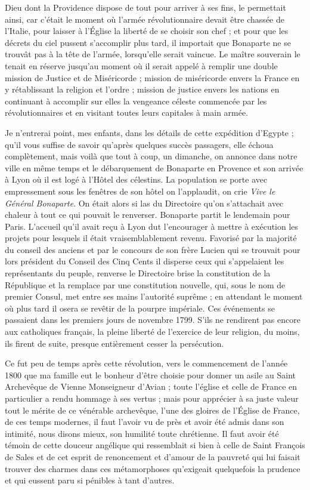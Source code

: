 \documentclass[11pt,a4paper]{report}
\begin{document}
Dieu dont la Providence dispose de tout pour arriver à ses fins, le permettait ainsi, car c'était le moment où l'armée révolutionnaire devait être chassée de l'Italie, pour laisser à l'Église la liberté de se choisir son chef ; et pour que les décrets du ciel pussent s'accomplir plus tard, il importait que Bonaparte ne se trouvât pas à la tête de l'armée, lorsqu'elle serait vaincue. Le maître souverain le tenait en réserve jusqu'au moment où il serait appelé à remplir une double mission de Justice et de Miséricorde ; mission de miséricorde envers la France en y rétablissant la religion et l'ordre ; mission de justice envers les nations en continuant à accomplir sur elles la vengeance céleste commencée par les révolutionnaires et en visitant toutes leurs capitales à main armée.

Je n'entrerai point, mes enfants, dans les détails de cette expédition d'Egypte ; qu'il vous suffise de savoir qu'après quelques succès passagers, elle échoua complètement, mais voilà que tout à coup, un dimanche, on annonce dans notre ville en même temps et le débarquement de Bonaparte en Provence et son arrivée à Lyon où il est logé à l'Hôtel des célestins. La population se porte avec empressement sous les fenêtres de son hôtel on l'applaudit, on crie \textit{Vive le Général Bonaparte}. On était alors si las du Directoire qu'on s'attachait avec chaleur à tout ce qui pouvait le renverser. Bonaparte partit le lendemain pour Paris. L'accueil qu'il avait reçu à Lyon dut l'encourager à mettre à exécution les projets pour lesquels il était vraisemblablement revenu. Favorisé par la majorité du conseil des anciens et par le concours de son frère Lucien qui se trouvait pour lors président du Conseil des Cinq Cents il disperse ceux qui s'appelaient les représentants du peuple, renverse le Directoire brise la constitution de la République et la remplace par une constitution nouvelle, qui, sous le nom de premier Consul, met entre ses mains l'autorité suprême ; en attendant le moment où plus tard il osera se revêtir de la pourpre impériale. Ces événements se passaient dans les premiers jours de novembre 1799. S'ils ne rendirent pas encore aux catholiques français, la pleine liberté de l'exercice de leur religion, du moins, ils firent de suite, presque entièrement cesser la persécution.

Ce fut peu de temps après cette révolution, vers le commencement de l'année 1800 que ma famille eut le bonheur d'être choisie pour donner un asile au Saint Archevêque de Vienne Monseigneur d'Avian ; toute l'église et celle de France en particulier a rendu hommage à ses vertus ; mais pour apprécier à sa juste valeur tout le mérite de ce vénérable archevêque, l'une des gloires de l'Église de France, de ces temps modernes, il faut l'avoir vu de près et avoir été admis dans son intimité, nous disons mieux, son humilité toute chrétienne. Il faut avoir été témoin de cette douceur angélique qui ressemblait si bien à celle de Saint François de Sales et de cet esprit de renoncement et d'amour de la pauvreté qui lui faisait trouver des charmes dans ces métamorphoses qu'exigeait quelquefois la prudence et qui eussent paru si pénibles à tant d'autres.
\end{document}
